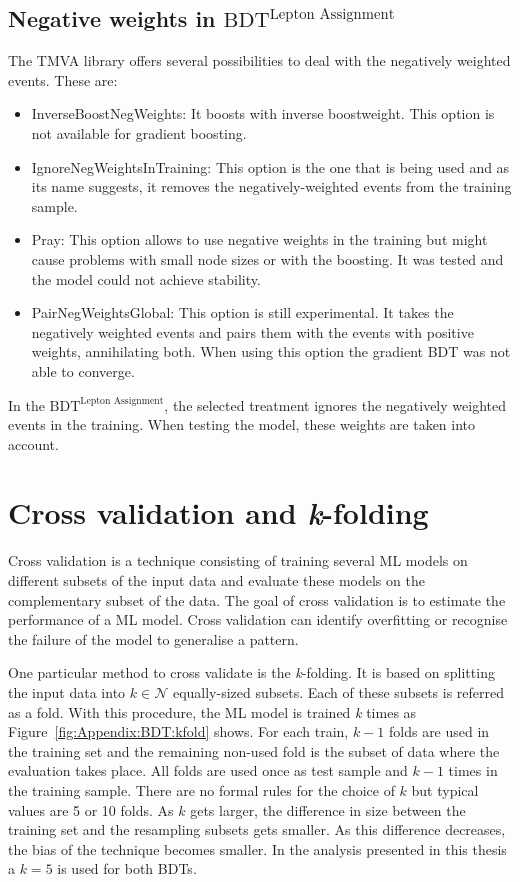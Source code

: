 \subsection{Negative weights in $\text{BDT}^{\text{Lepton Assignment}}$ }
\label{chap:Appendix:BDT:NegWeigts:TMVARoot}
The TMVA library offers several possibilities to deal with the negatively weighted events.
These are:
\begin{itemize}
	\item InverseBoostNegWeights: It boosts with inverse boostweight.
		This option is not available for gradient boosting.
	\item IgnoreNegWeightsInTraining: This option is the one that is being used and
		as its name suggests, it removes the negatively-weighted events from the training
		sample.
	\item Pray: This option allows to use negative weights in the training but might cause 
		problems with small node sizes or with the boosting. It was tested and the model could not
		achieve stability. 
	\item PairNegWeightsGlobal: This option is still experimental. It takes the negatively 
		weighted events and pairs them with the events with positive weights, annihilating both.
		When using this option the gradient BDT was not able to converge.
\end{itemize}
In the $\text{BDT}^{\text{Lepton Assignment}}$, the selected treatment ignores the negatively weighted events  
in the training. When testing the model, these weights are taken into account.




\section{Cross validation and \textit{k}-folding}
\label{chap:Appendix:BDT:kfold}
Cross validation is a technique consisting of training several ML models on different subsets of the input data
and evaluate these models on the complementary subset of the data. The goal of cross validation is to estimate the
performance of a ML model. Cross validation can identify overfitting or recognise the failure of the model to
generalise a pattern.

One particular method to cross validate is the \textit{k}-folding. It is based on splitting the input data into 
$k \in \mathcal{N}$ equally-sized subsets. Each of these subsets is referred as a fold. With this procedure, the ML model is 
trained \textit{k} times as Figure~\ref{fig:Appendix:BDT:kfold} shows. 
For each train, $k-1$ folds are used in the training set and the remaining non-used fold is the subset 
of data where the evaluation takes place. All folds are used once as test sample and $k-1$ times in the training 
sample. There are no formal rules for the choice of $k$ but typical values are 5 or 10 folds. As $k$ gets larger, the 
difference in size between the training set and the resampling subsets gets smaller. As this difference decreases, 
the bias of the technique becomes smaller. In the analysis
presented in this thesis a $k=5$ is used for both BDTs. 

